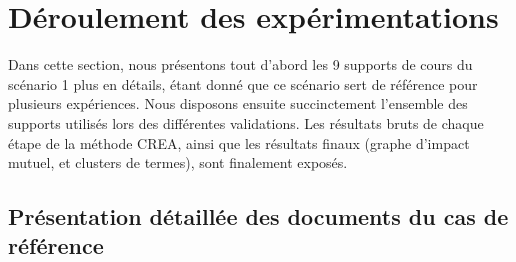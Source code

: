 \clearpage %
\newpage   %


\section{Déroulement des expérimentations}
\label{section:Evaluation:DeroulementExperimentations}

Dans cette section, nous présentons tout d'abord les 9 supports de cours du scénario 1 plus en détails, étant donné que ce scénario sert de référence pour plusieurs expériences.
Nous disposons ensuite succinctement l'ensemble des supports utilisés lors des différentes validations.
Les résultats bruts de chaque étape de la méthode CREA, ainsi que les résultats finaux (graphe d'impact mutuel, et clusters de termes), sont finalement exposés.


\subsection{Présentation détaillée des documents du cas de référence}
\label{subsection:Evaluation:DeroulementExperimentations:PresentationDocumentsCasRef}



